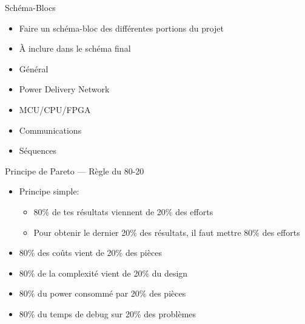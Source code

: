 \begin{frame}{Schéma-Blocs}
    \begin{twocolumns}
        \leftcol
        \begin{itemize}
            \item Faire un schéma-bloc des différentes portions du projet
            \item À inclure dans le schéma final 
        \end{itemize}

        \rightcol
        \begin{itemize}
            \item Général
            \item Power Delivery Network
            \item MCU/CPU/FPGA
            \item Communications
            \item Séquences
        \end{itemize}
    \end{twocolumns}
    \vfill
\end{frame}

\begin{frame}{Principe de Pareto --- Règle du 80-20}
    \begin{itemize}
        \item Principe simple:
        \begin{itemize}
            \item 80\% de tes résultats viennent de 20\% des efforts
            \item Pour obtenir le dernier 20\% des résultats, il faut mettre 80\% des efforts
        \end{itemize}
    \end{itemize}
    \vfill
     {
    }

     {
    \begin{twocolumns}[0.6]
        \leftcol
        \begin{itemize}
            \item 80\% des coûts vient de 20\% des pièces
            \item 80\% de la complexité vient de 20\% du design
            \item 80\% du power consommé par 20\% des pièces
            \item 80\% du temps de debug sur 20\% des problèmes
        \end{itemize}
        \rightcol
    \end{twocolumns}
    }
\end{frame}


